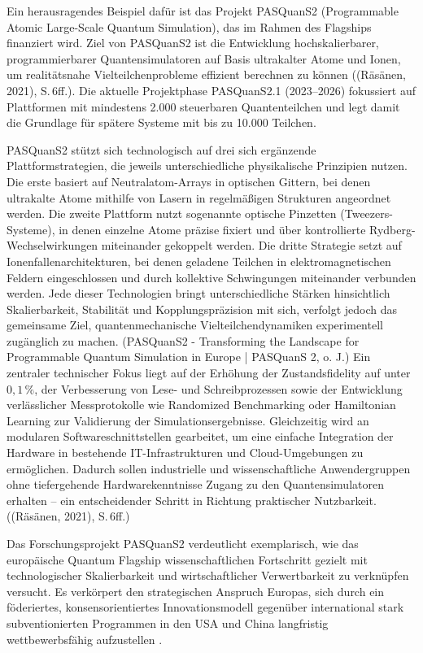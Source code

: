 Ein herausragendes Beispiel dafür ist das Projekt PASQuanS2 (Programmable Atomic Large-Scale Quantum Simulation), das im Rahmen des Flagships finanziert wird. Ziel von PASQuanS2 ist die Entwicklung hochskalierbarer, programmierbarer Quantensimulatoren auf Basis ultrakalter Atome und Ionen, um realitätsnahe Vielteilchenprobleme effizient berechnen zu können \cite{}((Räsänen, 2021), S. 6ff.). Die aktuelle Projektphase PASQuanS2.1 (2023–2026) fokussiert auf Plattformen mit mindestens 2.000 steuerbaren Quantenteilchen und legt damit die Grundlage für spätere Systeme mit bis zu 10.000 Teilchen. 

PASQuanS2 stützt sich technologisch auf drei sich ergänzende Plattformstrategien, die jeweils unterschiedliche physikalische Prinzipien nutzen. Die erste basiert auf Neutralatom-Arrays in optischen Gittern, bei denen ultrakalte Atome mithilfe von Lasern in regelmäßigen Strukturen angeordnet werden. Die zweite Plattform nutzt sogenannte optische Pinzetten (Tweezers-Systeme), in denen einzelne Atome präzise fixiert und über kontrollierte Rydberg-Wechselwirkungen miteinander gekoppelt werden. Die dritte Strategie setzt auf Ionenfallenarchitekturen, bei denen geladene Teilchen in elektromagnetischen Feldern eingeschlossen und durch kollektive Schwingungen miteinander verbunden werden. Jede dieser Technologien bringt unterschiedliche Stärken hinsichtlich Skalierbarkeit, Stabilität und Kopplungspräzision mit sich, verfolgt jedoch das gemeinsame Ziel, quantenmechanische Vielteilchendynamiken experimentell zugänglich zu machen. \cite{}(PASQuanS2 - Transforming the Landscape for Programmable Quantum Simulation in Europe | PASQuanS 2, o. J.) Ein zentraler technischer Fokus liegt auf der Erhöhung der Zustandsfidelity auf unter \(0{,}1\,\%\), der Verbesserung von Lese- und Schreibprozessen sowie der Entwicklung verlässlicher Messprotokolle wie Randomized Benchmarking oder Hamiltonian Learning zur Validierung der Simulationsergebnisse. Gleichzeitig wird an modularen Softwareschnittstellen gearbeitet, um eine einfache Integration der Hardware in bestehende IT-Infrastrukturen und Cloud-Umgebungen zu ermöglichen. Dadurch sollen industrielle und wissenschaftliche Anwendergruppen ohne tiefergehende Hardwarekenntnisse Zugang zu den Quantensimulatoren erhalten – ein entscheidender Schritt in Richtung praktischer Nutzbarkeit. \cite{}((Räsänen, 2021), S. 6ff.)

Das Forschungsprojekt PASQuanS2 verdeutlicht exemplarisch, wie das europäische Quantum Flagship wissenschaftlichen Fortschritt gezielt mit technologischer Skalierbarkeit und wirtschaftlicher Verwertbarkeit zu verknüpfen versucht. Es verkörpert den strategischen Anspruch Europas, sich durch ein föderiertes, konsensorientiertes Innovationsmodell gegenüber international stark subventionierten Programmen in den USA und China langfristig wettbewerbsfähig aufzustellen \citealp[7ff.]{vogiatzoglouEUsQuestDigital2025}.
 

